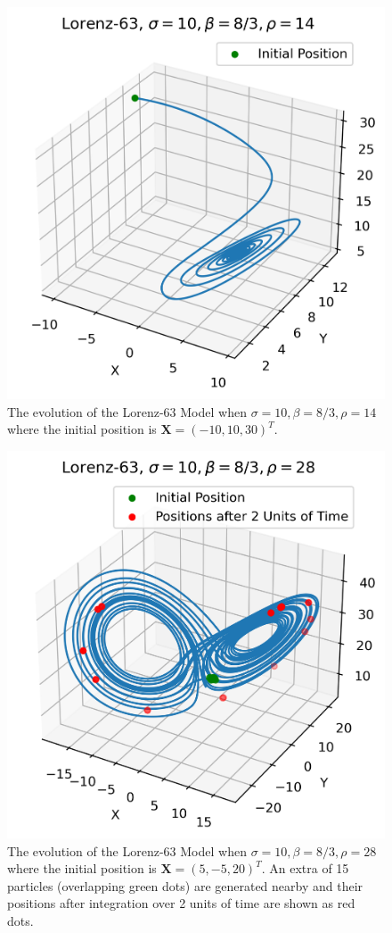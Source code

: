 \begin{figure}[p]
    \centering
    \includegraphics[scale=0.8]{graphics/Lorenz63_14.png}
    \caption{The evolution of the Lorenz-63 Model when $\sigma=10, \beta=8/3, \rho=14$ where the initial position is $\textbf{X} = (-10,10,30)^T$.}
    \label{fig:lor63r14}
\end{figure}
\begin{figure}
    \centering
    \includegraphics[scale=0.8]{graphics/Lorenz63_28.png}
    \caption{The evolution of the Lorenz-63 Model when $\sigma=10, \beta=8/3, \rho=28$ where the initial position is $\textbf{X} = (5,-5,20)^T$. An extra of 15 particles (overlapping green dots) are generated nearby and their positions after integration over 2 units of time are shown as red dots.}
    \label{fig:lor63r28}
\end{figure}

